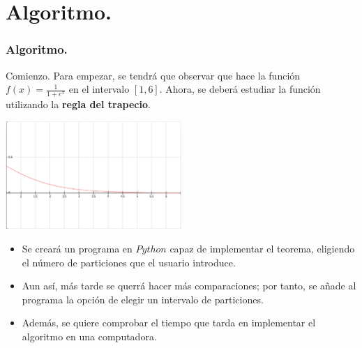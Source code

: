 \documentclass{beamer}
\begin{document}
  \section{Algoritmo.}
  \begin{frame}
    \frametitle{Algoritmo.}
    \begin{block}{Comienzo.}
      Para empezar, se tendrá que observar que hace la función $f(x)=\frac{1}{1+e^{x}}$ en el intervalo $[1, 6]$.
      Ahora, se deberá estudiar la función utilizando la \textbf{regla del trapecio}.
      \begin{center}
	\includegraphics[width=0.5\textwidth]{img4.eps}
      \end{center}
    \end{block}
  \end{frame}
  \begin{frame}
    \begin{block}{ }
      \begin{itemize}
	\item Se creará un programa en $Python$ capaz de implementar el teorema, eligiendo el número de particiones que el usuario introduce.
	\pause
	\item Aun así, más tarde se querrá hacer más comparaciones; por tanto, se añade al programa la opción de elegir un intervalo de particiones.
	\pause
	\item Además, se quiere comprobar el tiempo que tarda en implementar el algoritmo en una computadora.
      \end{itemize}
    \end{block}
  \end{frame}
\end{document}
